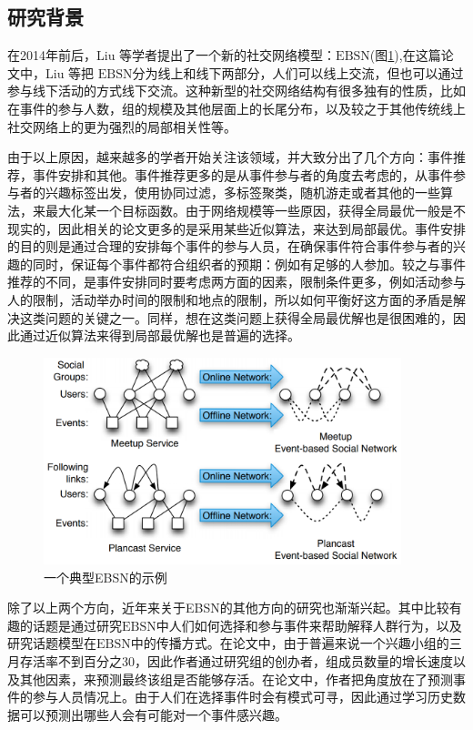 % 
\subsection{研究背景}
在2014年前后，Liu 等学者提出了一个新的社交网络模型：$\mathrm{EBSN}$(图\ref{f-ebsn}),在这篇论文中，Liu 等把 $\mathrm{EBSN}$分为线上和线下两部分，人们可以线上交流，但也可以通过参与线下活动的方式线下交流。这种新型的社交网络结构有很多独有的性质，比如在事件的参与人数，组的规模及其他层面上的长尾分布，以及较之于其他传统线上社交网络上的更为强烈的局部相关性等。

由于以上原因，越来越多的学者开始关注该领域，并大致分出了几个方向：事件推荐，事件安排和其他。事件推荐更多的是从事件参与者的角度去考虑的，从事件参与者的兴趣标签出发，使用协同过滤，多标签聚类，随机游走或者其他的一些算法，来最大化某一个目标函数。由于网络规模等一些原因，获得全局最优一般是不现实的，因此相关的论文更多的是采用某些近似算法，来达到局部最优。事件安排的目的则是通过合理的安排每个事件的参与人员，在确保事件符合事件参与者的兴趣的同时，保证每个事件都符合组织者的预期：例如有足够的人参加。较之与事件推荐的不同，是事件安排同时要考虑两方面的因素，限制条件更多，例如活动参与人的限制，活动举办时间的限制和地点的限制，所以如何平衡好这方面的矛盾是解决这类问题的关键之一。同样，想在这类问题上获得全局最优解也是很困难的，因此通过近似算法来得到局部最优解也是普遍的选择。

\begin{figure}[htp]
    \centering
    \includegraphics[width=10.4cm]{EBSN.png}
    \caption{一个典型EBSN的示例}
    \label{f-ebsn}
\end{figure}

除了以上两个方向，近年来关于EBSN的其他方向的研究也渐渐兴起。其中比较有趣的话题是通过研究$\mathrm{EBSN}$中人们如何选择和参与事件来帮助解释人群行为，以及研究话题模型在$\mathrm{EBSN}$中的传播方式。在论文中，由于普遍来说一个兴趣小组的三月存活率不到百分之30，因此作者通过研究组的创办者，组成员数量的增长速度以及其他因素，来预测最终该组是否能够存活。在论文中，作者把角度放在了预测事件的参与人员情况上。由于人们在选择事件时会有模式可寻，因此通过学习历史数据可以预测出哪些人会有可能对一个事件感兴趣。

